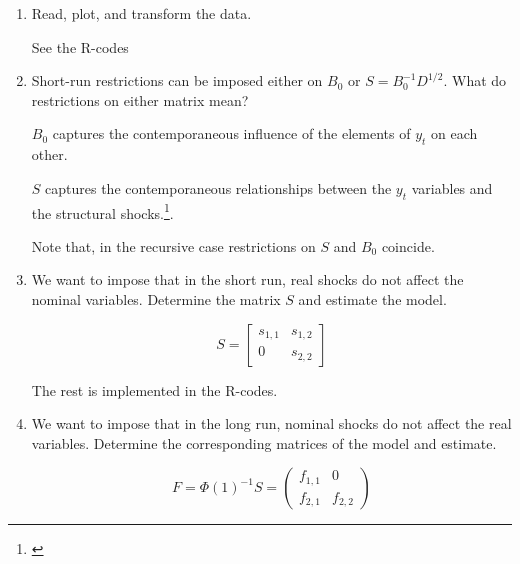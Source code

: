 \begin{enumerate}
    \item Read, plot, and transform the data.

          \begin{sol}
              See the R-codes
          \end{sol}

    \item Short-run restrictions can be imposed either on $B_0$ or $S = B_0^{-1} D^{1/2}$. What do restrictions on either matrix mean?

          \begin{sol}
              $B_0$ captures the contemporaneous influence of the elements of $y_t$ on each other.

              $S$ captures the contemporaneous relationships between the $y_t$ variables and the structural shocks.\footnote{\cite[see page 518][]{MartinHurnHarris-2012}}.

              Note that, in the recursive case restrictions on $S$ and $B_0$ coincide.
          \end{sol}

    \item We want to impose that in the short run, real shocks do not affect the nominal variables. Determine the matrix $S$ and estimate the model.

          \begin{sol}
              \[
                  S = \begin{bmatrix}
                      s_{1, 1} & s_{1, 2} \\
                      0        & s_{2, 2}
                  \end{bmatrix}
              \]

              The rest is implemented in the R-codes.
          \end{sol}

    \item We want to impose that in the long run, nominal shocks do not affect the real variables. Determine the corresponding matrices of the \svarp{} model and estimate.

          \begin{sol}
              \[
                  F = \Phi(1)^{-1} S =  \begin{pmatrix}
                      f_{1, 1} & 0        \\
                      f_{2, 1} & f_{2, 2}
                  \end{pmatrix}
              \]
          \end{sol}


\end{enumerate}
